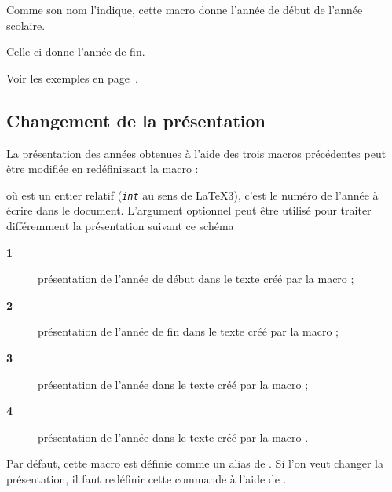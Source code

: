 \documentclass[full]{l3doc}
\begin{document}
\begin{function}{\debutanneescolaire}
  \begin{syntax}
  \end{syntax}
\end{function}

Comme son nom l'indique, cette macro donne l'année de début de l'année scolaire.

\begin{function}{\finanneescolaire}
  \begin{syntax}
  \end{syntax}
\end{function}

Celle-ci donne l'année de fin.

Voir les exemples en page~\pageref{sec:ecrireannee}.

\subsection{Changement de la présentation}
\label{sec:presentation}

La présentation des années obtenues à l'aide des trois macros précédentes peut
être modifiée en redéfinissant la macro :
\begin{function}{\AnneeScolairePresentation}
  \begin{syntax}
  \end{syntax}
  où  est un entier relatif (\texttt{\textit{int}} au sens de
  \LaTeX3), c'est le numéro de l'année à écrire dans le document. L'argument
  optionnel  peut être utilisé pour traiter différemment la
  présentation suivant ce schéma
  \begin{description}
  \item[\textbf{1}] présentation de l'année de début dans le texte créé par la
    macro ;
  \item[\textbf{2}] présentation de l'année de fin dans le texte créé par la
    macro ;
  \item[\textbf{3}] présentation de l'année dans le texte créé par la
    macro ;
  \item[\textbf{4}]  présentation de l'année dans le texte créé par la
    macro .
  \end{description}

  Par défaut, cette macro est définie comme un alias de .
  Si l'on veut changer la présentation, il faut redéfinir cette commande à
  l'aide de .
\end{function}
\end{document}
